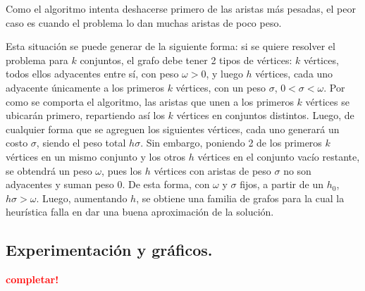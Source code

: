 Como el algoritmo intenta deshacerse primero de las aristas más pesadas, el
peor caso es cuando el problema lo dan muchas aristas de poco peso.

Esta situación se puede generar de la siguiente forma: si se quiere resolver el
problema para $k$ conjuntos, el grafo debe tener 2 tipos de vértices: $k$
vértices, todos ellos adyacentes entre sí, con peso $\omega > 0$, y luego $h$
vértices, cada uno adyacente únicamente a los primeros $k$ vértices, con un
peso $\sigma$, $0 < \sigma < \omega$.  Por como se comporta el algoritmo, las
aristas que unen a los primeros $k$ vértices se ubicarán primero, repartiendo
así los $k$ vértices en conjuntos distintos. Luego, de cualquier forma que se
agreguen los siguientes vértices, cada uno generará un costo $\sigma$, siendo
el peso total $h \sigma$. Sin embargo, poniendo 2 de los primeros $k$ vértices
en un mismo conjunto y los otros $h$ vértices en el conjunto vacío restante,
se obtendrá un peso $\omega$, pues los $h$ vértices con aristas de peso
$\sigma$ no son adyacentes y suman peso $0$. De esta forma, con $\omega$ y
$\sigma$ fijos, a partir de un $h_0$, $h \sigma > \omega$. Luego, aumentando
$h$, se obtiene una familia de grafos para la cual la heurística falla en dar
una buena aproximación de la solución.


\newpage \subsection{Experimentación y gráficos.}
\vspace*{0.3cm}

\textcolor{red}{\textbf{completar!}}
